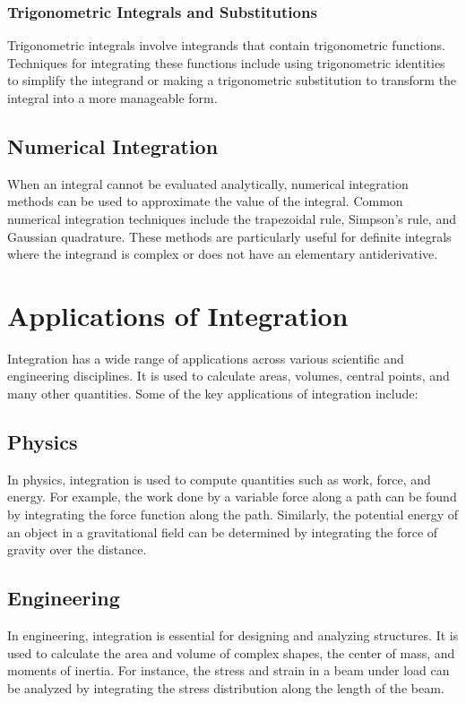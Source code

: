 \documentclass[12pt]{article}
\begin{document}
\subsubsection{Trigonometric Integrals and Substitutions}
Trigonometric integrals involve integrands that contain trigonometric functions. Techniques for integrating these functions include using trigonometric identities to simplify the integrand or making a trigonometric substitution to transform the integral into a more manageable form.

\subsection{Numerical Integration}
When an integral cannot be evaluated analytically, numerical integration methods can be used to approximate the value of the integral. Common numerical integration techniques include the trapezoidal rule, Simpson's rule, and Gaussian quadrature. These methods are particularly useful for definite integrals where the integrand is complex or does not have an elementary antiderivative.

\section{Applications of Integration}
Integration has a wide range of applications across various scientific and engineering disciplines. It is used to calculate areas, volumes, central points, and many other quantities. Some of the key applications of integration include:

\subsection{Physics}
In physics, integration is used to compute quantities such as work, force, and energy. For example, the work done by a variable force along a path can be found by integrating the force function along the path. Similarly, the potential energy of an object in a gravitational field can be determined by integrating the force of gravity over the distance.

\subsection{Engineering}
In engineering, integration is essential for designing and analyzing structures. It is used to calculate the area and volume of complex shapes, the center of mass, and moments of inertia. For instance, the stress and strain in a beam under load can be analyzed by integrating the stress distribution along the length of the beam.
\end{document}
